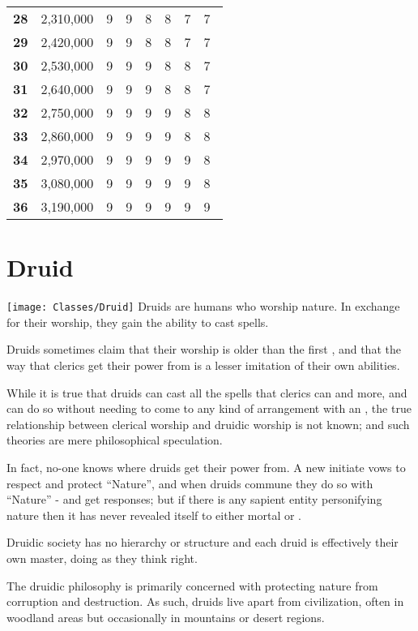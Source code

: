\begin{multicols*}{2}
\begin {table}[H]
\begin{tabularx}{\columnwidth}{>{\bfseries}YcYYYYYY}
		28 & 2,310,000 & 9 & 9 & 8 & 8 & 7 & 7\\
		29 & 2,420,000 & 9 & 9 & 8 & 8 & 7 & 7\\
		30 & 2,530,000 & 9 & 9 & 9 & 8 & 8 & 7\\
		31 & 2,640,000 & 9 & 9 & 9 & 8 & 8 & 7\\
		32 & 2,750,000 & 9 & 9 & 9 & 9 & 8 & 8\\
		33 & 2,860,000 & 9 & 9 & 9 & 9 & 8 & 8\\
		34 & 2,970,000 & 9 & 9 & 9 & 9 & 9 & 8\\
		35 & 3,080,000 & 9 & 9 & 9 & 9 & 9 & 8\\
		36 & 3,190,000 & 9 & 9 & 9 & 9 & 9 & 9\
  \end {tabularx}
\end {table}

\section{Druid}\label{class:Druid}
\texttt{[image: Classes/Druid]}
Druids are humans who worship nature. In exchange for their worship, they gain the ability to cast spells.

Druids sometimes claim that their worship is older than the first , and that the way that clerics get their power from  is a lesser imitation of their own abilities.

While it is true that druids can cast all the spells that clerics can and more, and can do so without needing to come to any kind of arrangement with an , the true relationship between clerical worship and druidic worship is not known; and such theories are mere philosophical speculation.

In fact, no-one knows where druids get their power from. A new initiate vows to respect and protect “Nature”, and when druids commune they do so with “Nature” - and get responses; but if there is any sapient entity personifying nature then it has never revealed itself to either mortal or .

Druidic society has no hierarchy or structure and each druid is effectively their own master, doing as they think right.

The druidic philosophy is primarily concerned with protecting nature from corruption and destruction. As such, druids live apart from civilization, often in woodland areas but occasionally in mountains or desert regions.


\end{multicols*}
